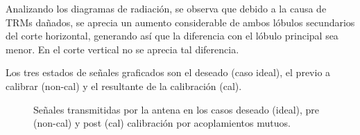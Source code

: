 Analizando los diagramas de radiación, se observa que debido a la causa de TRMs dañados, se aprecia un aumento considerable de
ambos lóbulos secundarios del corte horizontal, generando así que la diferencia con el lóbulo principal sea menor. En el corte
vertical no se aprecia tal diferencia. 

Los tres estados de señales graficados son el deseado (caso ideal), el previo a calibrar (non-cal) y el resultante de la
calibración (cal).
\begin{figure}[H]
	\centering

	\caption{Señales transmitidas por la antena en los casos deseado (ideal), pre (non-cal) y post (cal) calibración por acoplamientos mutuos.}
	\label{fig:deadTRMsMutual10degRow}
\end{figure}
